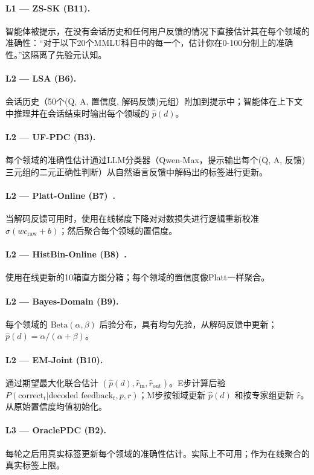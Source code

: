 \documentclass[11pt,a4paper,fontset=fandol]{ctexart}
\begin{document}
\paragraph{L1 --- ZS-SK (B11).} 智能体被提示，在没有会话历史和任何用户反馈的情况下直接估计其在每个领域的准确性：“对于以下20个MMLU科目中的每一个，估计你在0-100分制上的准确性。”这隔离了先验元认知。
\paragraph{L2 --- LSA (B6).} 会话历史（50个(Q, A, 置信度, 解码反馈)元组）附加到提示中；智能体在上下文中推理并在会话结束时输出每个领域的 $\hat p(d)$。
\paragraph{L2 --- UF-PDC (B3).} 每个领域的准确性估计通过LLM分类器（Qwen-Max，提示输出每个(Q, A, 反馈)三元组的二元正确性判断）从自然语言反馈中解码出的标签进行更新。
\paragraph{L2 --- Platt-Online (B7)~\citep{platt1999probabilistic}.} 当解码反馈可用时，使用在线梯度下降对对数损失进行逻辑重新校准 $\sigma(w c_{\text{raw}} + b)$；然后聚合每个领域的置信度。
\paragraph{L2 --- HistBin-Online (B8)~\citep{zadrozny2001obtaining}.} 使用在线更新的10箱直方图分箱；每个领域的置信度像Platt一样聚合。
\paragraph{L2 --- Bayes-Domain (B9).} 每个领域的 $\text{Beta}(\alpha, \beta)$ 后验分布，具有均匀先验，从解码反馈中更新；$\hat p(d) = \alpha/(\alpha+\beta)$。
\paragraph{L2 --- EM-Joint (B10).} 通过期望最大化联合估计 $(\hat p(d), \hat r_{\text{in}}, \hat r_{\text{out}})$。E步计算后验 $P(\text{correct}_t | \text{decoded feedback}_t, p, r)$；M步按领域更新 $\hat p(d)$ 和按专家组更新 $\hat r$。从原始置信度均值初始化。
\paragraph{L3 --- OraclePDC (B2).} 每轮之后用真实标签更新每个领域的准确性估计。实际上不可用；作为在线聚合的真实标签上限。
\end{document}
